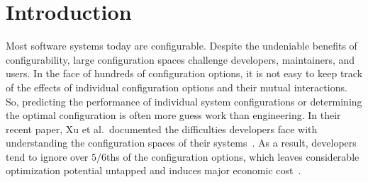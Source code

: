 \documentclass{sig-alternative}
\begin{document}

 
\section{Introduction}
 

Most software systems today are configurable. Despite the undeniable benefits
of configurability, large configuration spaces challenge developers, maintainers, and users. In the face of hundreds of configuration options, it is not easy to keep track of the effects of individual configuration options and their mutual interactions. So, predicting the performance of individual system configurations or determining the optimal configuration is often more guess work than engineering. In their recent paper, Xu et al.\ documented the  difficulties developers face
with understanding  the configuration spaces of their systems~\cite{xu2015hey}. As a result, developers tend to ignore over $5/6$ths of the configuration options, which leaves considerable optimization potential untapped and induces major economic cost~\cite{xu2015hey}.
\end{document}
